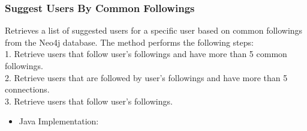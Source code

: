 \newpage

\subsubsection*{Suggest Users By Common Followings}

Retrieves a list of suggested users for a specific user based on common followings from the Neo4j database.
The method performs the following steps:\\
1. Retrieve users that follow user's followings and have more than 5 common followings.\\
2. Retrieve users that are followed by user's followings and have more than 5 connections.\\
3. Retrieve users that follow user's followings.\\
\begin{itemize}
    \item Java Implementation:
\end{itemize}

